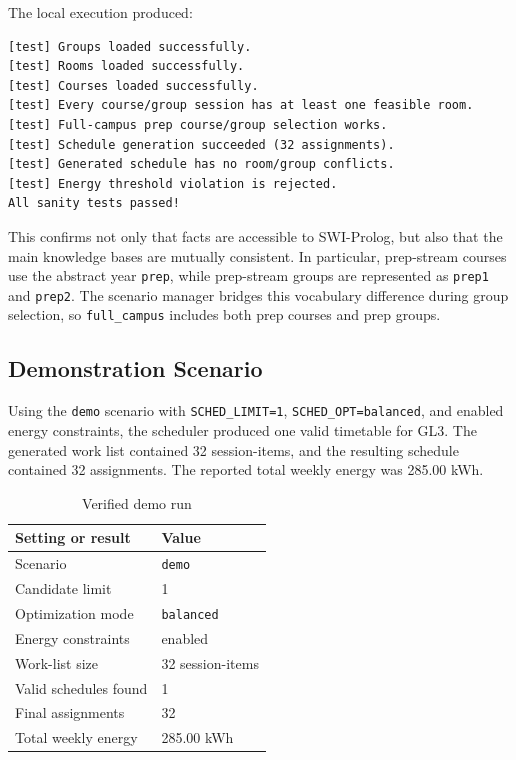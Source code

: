 \documentclass[12pt,a4paper]{article}
\newcommand{\term}[1]{\texttt{#1}}
\begin{document}
The local execution produced:

\begin{lstlisting}[language=PlainText,caption={Sanity test result}]
[test] Groups loaded successfully.
[test] Rooms loaded successfully.
[test] Courses loaded successfully.
[test] Every course/group session has at least one feasible room.
[test] Full-campus prep course/group selection works.
[test] Schedule generation succeeded (32 assignments).
[test] Generated schedule has no room/group conflicts.
[test] Energy threshold violation is rejected.
All sanity tests passed!
\end{lstlisting}

This confirms not only that facts are accessible to SWI-Prolog, but also that the main knowledge bases are mutually consistent. In particular, prep-stream courses use the abstract year \term{prep}, while prep-stream groups are represented as \term{prep1} and \term{prep2}. The scenario manager bridges this vocabulary difference during group selection, so \term{full\_campus} includes both prep courses and prep groups.

\subsection{Demonstration Scenario}

Using the \term{demo} scenario with \term{SCHED\_LIMIT=1}, \term{SCHED\_OPT=balanced}, and enabled energy constraints, the scheduler produced one valid timetable for GL3. The generated work list contained 32 session-items, and the resulting schedule contained 32 assignments. The reported total weekly energy was 285.00 kWh.

\begin{table}[h]
    \centering
    \caption{Verified demo run}
    \begin{tabular}{ll}
        \toprule
        Setting or result & Value \\
        \midrule
        Scenario & \term{demo} \\
        Candidate limit & 1 \\
        Optimization mode & \term{balanced} \\
        Energy constraints & enabled \\
        Work-list size & 32 session-items \\
        Valid schedules found & 1 \\
        Final assignments & 32 \\
        Total weekly energy & 285.00 kWh \\
        \bottomrule
    \end{tabular}
\end{table}
\end{document}
